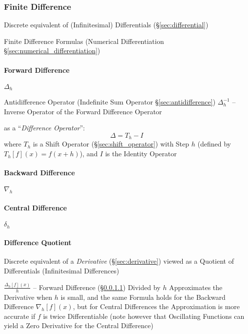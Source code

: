 \subsubsection{Finite Difference}\label{sec:finite_difference}

Discrete equivalent of (Infinitesimal) Differentials (\S\ref{sec:differential})

Finite Difference Formulas (Numerical Differentiation
\S\ref{sec:numerical_differentiation})



\paragraph{Forward Difference}\label{sec:forward_difference}\hfill

$\Delta_h$

\fist Antidifference Operator (Indefinite Sum Operator
\S\ref{sec:antidifference}) $\Delta^{-1}_h$ -- Inverse Operator of the Forward
Difference Operator

as a ``\emph{Difference Operator}'':
\[
  \Delta = T_h - I
\]
where $T_h$ is a Shift Operator (\S\ref{sec:shift_operator}) with Step $h$
(defined by $T_h[f](x) = f(x + h)$), and $I$ is the Identity Operator



\paragraph{Backward Difference}\label{sec:backward_difference}\hfill

$\nabla_h$



\paragraph{Central Difference}\label{sec:central_difference}\hfill

$\delta_h$



\paragraph{Difference Quotient}\label{sec:difference_quotient}\hfill

\fist Discrete equivalent of a \emph{Derivative} (\S\ref{sec:derivative}) viewed
as a Quotient of Differentials (Infinitesimal Differences)

$\frac{\Delta_h[f](x)}{h}$ -- Forward Difference
(\S\ref{sec:forward_difference}) Divided by $h$ Approximates the Derivative when
$h$ is small, and the same Formula holds for the Backward Difference
$\nabla_h[f](x)$, but for Central Differences the Approximation is more accurate
if $f$ is twice Differentiable (note however that Oscillating Functions can
yield a Zero Derivative for the Central Difference)

